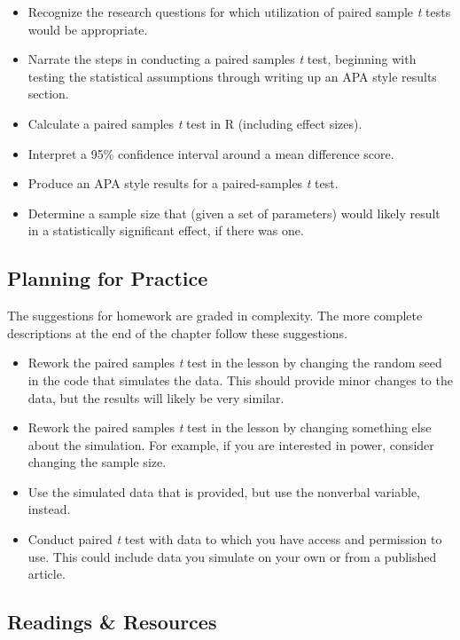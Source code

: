 \documentclass[
  11pt,
]{book}
\providecommand{\tightlist}{%
  \setlength{\itemsep}{0pt}\setlength{\parskip}{0pt}}
\begin{document}
\begin{itemize}
\tightlist
\item
  Recognize the research questions for which utilization of paired sample \emph{t} tests would be appropriate.
\item
  Narrate the steps in conducting a paired samples \emph{t} test, beginning with testing the statistical assumptions through writing up an APA style results section.
\item
  Calculate a paired samples \emph{t} test in R (including effect sizes).
\item
  Interpret a 95\% confidence interval around a mean difference score.
\item
  Produce an APA style results for a paired-samples \emph{t} test.
\item
  Determine a sample size that (given a set of parameters) would likely result in a statistically significant effect, if there was one.
\end{itemize}

\hypertarget{planning-for-practice-3}{%
\subsection{Planning for Practice}\label{planning-for-practice-3}}

The suggestions for homework are graded in complexity. The more complete descriptions at the end of the chapter follow these suggestions.

\begin{itemize}
\tightlist
\item
  Rework the paired samples \emph{t} test in the lesson by changing the random seed in the code that simulates the data. This should provide minor changes to the data, but the results will likely be very similar.
\item
  Rework the paired samples \emph{t} test in the lesson by changing something else about the simulation. For example, if you are interested in power, consider changing the sample size.
\item
  Use the simulated data that is provided, but use the nonverbal variable, instead.
\item
  Conduct paired \emph{t} test with data to which you have access and permission to use. This could include data you simulate on your own or from a published article.
\end{itemize}

\hypertarget{readings-resources-3}{%
\subsection{Readings \& Resources}\label{readings-resources-3}}
\end{document}
